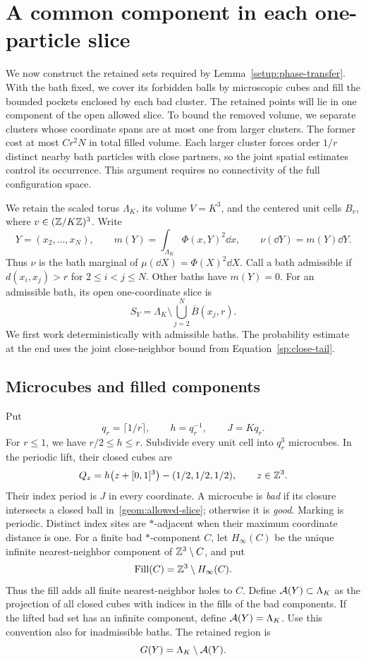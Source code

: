 \section{A common component in each one-particle slice}
\label{geom:section}

We now construct the retained sets required by
Lemma~\ref{setup:phase-transfer}. With the bath fixed, we cover its
forbidden balls by microscopic cubes and fill the bounded pockets enclosed
by each bad cluster. The retained points will lie in one component of the
open allowed slice. To bound the removed volume, we separate clusters
whose coordinate spans are at most one from larger clusters. The former
cost at most $Cr^2N$ in total filled volume. Each larger cluster forces order
$1/r$ distinct nearby bath particles with close partners, so the joint
spatial estimates control its occurrence. This argument requires no
connectivity of the full configuration space.

We retain the scaled torus $\Lambda_K$, its volume $V=K^3$, and the centered
unit cells $B_v$, where $v\in(\mathbb Z/K\mathbb Z)^3$. Write
\[
 Y=(x_2,\ldots,x_N),\qquad
 m(Y)=\int_{\Lambda_K}\Phi(x,Y)^2\dd x,\qquad
 \nu(\dd Y)=m(Y)\dd Y.
\]
Thus $\nu$ is the bath marginal of $\mu(\dd X)=\Phi(X)^2\dd X$.
Call a bath admissible if $d(x_i,x_j)>r$ for $2\le i<j\le N$.
Other baths have $m(Y)=0$. For an admissible bath, its open
one-coordinate slice is
\begin{equation}\label{geom:allowed-slice}
 S_Y=\Lambda_K\setminus\bigcup_{j=2}^N\overline B(x_j,r).
\end{equation}
We first work deterministically with admissible baths. The probability
estimate at the end uses the joint close-neighbor bound from
Equation~\eqref{sp:close-tail}.

\subsection{Microcubes and filled components}

Put
\[
 q_r=\lceil1/r\rceil,\qquad h=q_r^{-1},\qquad J=Kq_r.
\]
For $r\le1$, we have $r/2\le h\le r$. Subdivide every unit cell into
$q_r^3$ microcubes. In the periodic lift, their closed cubes are
\[
 Q_z=h\bigl(z+[0,1]^3\bigr)-(1/2,1/2,1/2),\qquad z\in\mathbb Z^3.
\]
Their index period is $J$ in every coordinate. A microcube is \emph{bad}
if its closure intersects a closed ball in~\eqref{geom:allowed-slice};
otherwise it is \emph{good}. Marking is periodic. Distinct index sites are
$*$-adjacent when their maximum coordinate distance is one. For a finite
bad $*$-component $C$, let $H_\infty(C)$ be the unique infinite
nearest-neighbor component of $\mathbb Z^3\setminus C$, and put
\[
 \operatorname{Fill}(C)=\mathbb Z^3\setminus H_\infty(C).
\]
Thus the fill adds all finite nearest-neighbor holes to $C$.
Define $\mathcal A(Y)\subset\Lambda_K$ as the projection of all closed cubes with
indices in the fills of the bad components. If the lifted bad set has an
infinite component, define $\mathcal A(Y)=\Lambda_K$. Use this convention also
for inadmissible baths. The retained region is
\[
 G(Y)=\Lambda_K\setminus\mathcal A(Y).
\]

